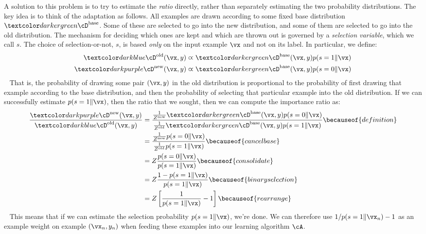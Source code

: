 A solution to this problem is to try to estimate the \emph{ratio} directly, rather than separately estimating the two probability distributions.
The key idea is to think of the adaptation as follows.
All examples are drawn according to some fixed base distribution $\Dbase$.
Some of these are selected to go into the new distribution, and some of them are selected to go into the old distribution.
The mechanism for deciding which ones are kept and which are thrown out is governed by a \emph{selection variable}, which we call $s$.
The choice of selection-or-not, $s$, is based \emph{only} on the input example $\vx$ and not on its label.
In particular, we define:
~
\begin{align}
\Dold(\vx,y) &\varpropto \Dbase(\vx,y) p(s=1 \| \vx) \\
\Dnew(\vx,y) &\varpropto \Dbase(\vx,y) p(s=0 \| \vx)
\end{align}
~
That is, the probability of drawing some pair $(\vx,y)$ in the old distribution is proportional to the probability of first drawing that example according to the base distribution, and then the probability of selecting that particular example into the old distribution.
If we can successfully estimate $p(s=1 \| \vx)$, then the ratio that we sought, then we can compute the importance ratio as:
~
\begin{align}
\frac {\Dnew(\vx,y)} {\Dold(\vx,y)}
&= \frac { \frac 1 {Z^{\text{new}}} \Dbase(\vx,y) p(s=0 \| \vx) }
         { \frac 1 {Z^{\text{old}}} \Dbase(\vx,y) p(s=1 \| \vx) }
  \becauseof{definition} \\
&= \frac { \frac 1 {Z^{\text{new}}} p(s=0 \| \vx) }
         { \frac 1 {Z^{\text{old}}} p(s=1 \| \vx) }
  \becauseof{cancel base} \\
&= Z \frac { p(s=0 \| \vx) } { p(s=1 \| \vx) }
  \becauseof{consolidate} \\
&= Z \frac { 1 - p(s=1 \| \vx) } { p(s=1 \| \vx) }
  \becauseof{binary selection} \\
&= Z \left[ \frac 1 {p(s=1 \| \vx)} - 1 \right]
  \becauseof{rearrange}
\end{align}
~
This means that if we can estimate the selection probability $p(s=1\|\vx)$, we're done.
We can therefore use $1 / p(s=1 \| \vx_n) - 1$ as an example weight on example $(\vx_n, y_n)$ when feeding these examples into our learning algorithm $\cA$.

